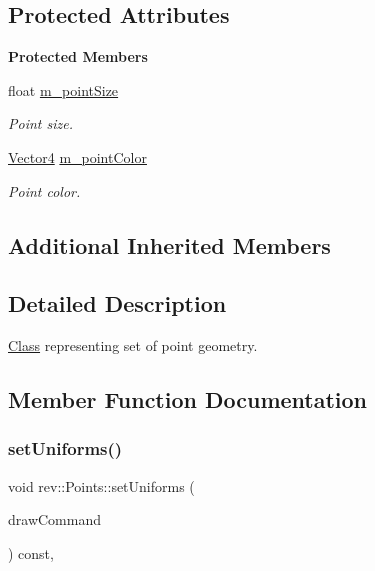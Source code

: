 \subsection*{Protected Attributes}
\begin{Indent}\textbf{ Protected Members}\par
\begin{DoxyCompactItemize}
\item 
\mbox{\label{classrev_1_1_points_ade2a8324f5776ee1076a08690d5d03ef}} 
float \mbox{\hyperlink{classrev_1_1_points_ade2a8324f5776ee1076a08690d5d03ef}{m\+\_\+point\+Size}}
\begin{DoxyCompactList}\small\item\em Point size. \end{DoxyCompactList}\item 
\mbox{\label{classrev_1_1_points_aee9aa325ddb46770d42449bb934d0d2b}} 
\mbox{\hyperlink{classrev_1_1_vector}{Vector4}} \mbox{\hyperlink{classrev_1_1_points_aee9aa325ddb46770d42449bb934d0d2b}{m\+\_\+point\+Color}}
\begin{DoxyCompactList}\small\item\em Point color. \end{DoxyCompactList}\end{DoxyCompactItemize}
\end{Indent}
\subsection*{Additional Inherited Members}


\subsection{Detailed Description}
\mbox{\hyperlink{struct_class}{Class}} representing set of point geometry. 

\subsection{Member Function Documentation}
\mbox{\label{classrev_1_1_points_a598b47126cab4485664cb83f07ba2651}} 
\subsubsection{\texorpdfstring{setUniforms()}{setUniforms()}}
{\footnotesize\ttfamily void rev\+::\+Points\+::set\+Uniforms (\begin{DoxyParamCaption}\item[{\mbox{\hyperlink{classrev_1_1_draw_command}{Draw\+Command}} \&}]{draw\+Command }\end{DoxyParamCaption}) const\hspace{0.3cm}{\ttfamily [override]}, {\ttfamily [virtual]}}



